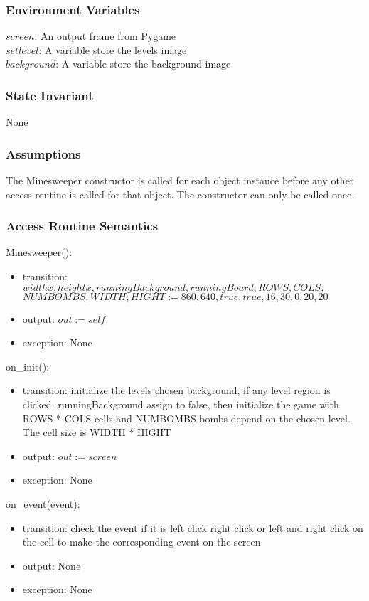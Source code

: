 \documentclass[12pt]{article}
\begin{document}
\subsubsection {Environment Variables}

$screen$: An output frame from Pygame\\
$setlevel$: A variable store the levels image\\
$background$: A variable store the background image

\subsubsection {State Invariant}

None

\subsubsection {Assumptions}
The Minesweeper constructor is called for each object instance before any
other access routine is called for that object.  The constructor can only be
called once.


\subsubsection {Access Routine Semantics}

Minesweeper():
\begin{itemize}
\item transition: $widthx, heightx, runningBackground, runningBoard, ROWS, COLS,$\\$ NUMBOMBS, WIDTH, HIGHT := 860,640,true,true,16,30,0,20,20$
\item output: $\mathit{out} := \mathit{self}$
\item exception: None
\end{itemize}

\noindent on\_init():
\begin{itemize}
\item transition: initialize the levels chosen background, if any level region is clicked, runningBackground assign to false, then initialize the game with ROWS * COLS cells and NUMBOMBS bombs depend on the chosen level. The cell size is WIDTH * HIGHT
\item output: $out:= screen$
\item exception: None
\end{itemize}

\noindent on\_event(event):
\begin{itemize}
\item transition: check the event if it is left click right click or left and right click on the cell to make the corresponding event on the screen
\item output: None
\item exception: None
\end{itemize}
\end{document}
